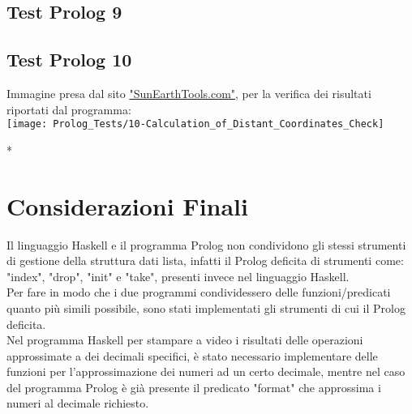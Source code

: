 \documentclass{article}
\begin{document}
\lstset{inputencoding=utf8/latin1}


\subsection*{Test Prolog 9}

\lstset{inputencoding=utf8/latin1}


\subsection*{Test Prolog 10}

\lstset{inputencoding=utf8/latin1}


	\bigskip
	Immagine presa dal sito \href{https://www.sunearthtools.com/it/tools/distance.php}{"SunEarthTools.com"}, per la verifica dei risultati riportati dal programma:\\
	\texttt{[image: Prolog\_Tests/10-Calculation\_of\_Distant\_Coordinates\_Check]}
\newpage

\/*
\section{Considerazioni Finali}
\raggedright

Il linguaggio Haskell e il programma Prolog non condividono gli stessi strumenti di gestione della struttura dati lista, infatti il Prolog deficita di strumenti come: "index", "drop", "init" e "take", presenti invece nel linguaggio Haskell.\\
Per fare in modo che i due programmi condividessero delle funzioni/predicati quanto più simili possibile, sono stati implementati gli strumenti di cui il Prolog deficita.\\
%


Nel programma Haskell per stampare a video i risultati delle operazioni approssimate a dei decimali specifici, è stato necessario implementare delle funzioni per l'approssimazione dei numeri ad un certo decimale, mentre nel caso del programma Prolog è già presente il predicato "format" che approssima i numeri al decimale richiesto.\\
%
\end{document}
